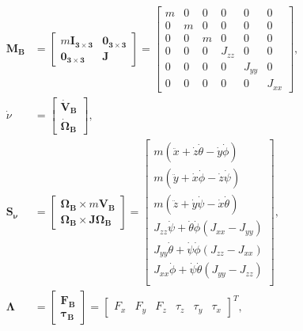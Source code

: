 \begin{align}
\begin{split}
\mathbf{M_{B}} & = \begin{bmatrix}
m\mathbf{I_{3\times3}} & \mathbf{0_{3\times 3}} \\
\mathbf{0_{3\times 3}} & \mathbf{J}
\end{bmatrix} = \begin{bmatrix}
m & 0 & 0 & 0 & 0 & 0 \\
0 & m & 0 & 0 & 0 & 0 \\
0 & 0 & m & 0 & 0 & 0 \\
0 & 0 & 0 & J_{zz} & 0 & 0 \\
0 & 0 & 0 & 0 & J_{yy} & 0 \\
0 & 0 & 0 & 0 & 0 & J_{xx}
\end{bmatrix},\\[8px]
\dot{\nu} & = \begin{bmatrix}
\mathbf{\dot{V}_{B}} \\ \mathbf{\dot{\Omega}_B}
\end{bmatrix}, \\[8px]
\mathbf{S_\nu} & = \begin{bmatrix}
\mathbf{\Omega_B} \times m\mathbf{V_{B}} \\
\mathbf{\Omega_B} \times \mathbf{J}\mathbf{\Omega_B}
\end{bmatrix} =
\begin{bmatrix}
m(\ddot{x} + \dot{z}\dot{\theta} - \dot{y}\dot{\phi})\\
m(\ddot{y} + \dot{x}\dot{\phi} - \dot{z}\dot{\psi})\\
m(\ddot{z} + \dot{y}\dot{\psi} - \dot{x}\dot{\theta})\\
J_{zz}\dot{\psi} + \dot{\theta}\dot{\phi}(J_{xx} - J_{yy})\\
J_{yy}\dot{\theta} + \dot{\psi}\dot{\phi}(J_{zz} - J_{xx})\\
J_{xx}\dot{\phi} + \dot{\psi}\dot{\theta}(J_{yy} - J_{zz})\\
\end{bmatrix},\\[8px]
\mathbf{\Lambda} & = \begin{bmatrix}
\mathbf{F_{B}} \\ \mathbf{\tau_{B}}
\end{bmatrix} = \begin{bmatrix}
F_x & F_y & F_z & \tau_z & \tau_y & \tau_x
\end{bmatrix}^{T},
\end{split}
\end{align}
